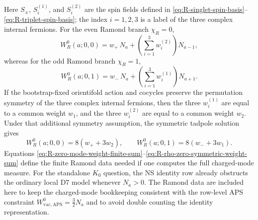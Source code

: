 \documentclass[11pt]{article}
\newcommand{\vac}{\mathrm{vac}}
\begin{document}
Here \(S_\pm\), \(S_i^{(1)}\), and \(S_i^{(2)}\) are the spin fields defined in
\eqref{eq:R-singlet-spin-basis}--\eqref{eq:R-triplet-spin-basis}; the index \(i=1,2,3\) is a
label of the three complex internal fermions. For the even Ramond branch \(\chi_R=0\),
\begin{equation}
  W_R^0(a;0,0)
  =
  w_+\,N_a
  +
  \left(\sum_{i=1}^{3}w_i^{(2)}\right)N_{a-1},
  \label{eq:R-rho-zero-even-weight-sum}
\end{equation}
whereas for the odd Ramond branch \(\chi_R=1\),
\begin{equation}
  W_R^0(a;0,1)
  =
  w_-\,N_a
  +
  \left(\sum_{i=1}^{3}w_i^{(1)}\right)N_{a+1}.
  \label{eq:R-rho-zero-odd-weight-sum}
\end{equation}
If the bootstrap-fixed orientifold action and cocycles preserve the permutation symmetry of the
three complex internal fermions, then the three \(w_i^{(1)}\) are equal to a common weight
\(w_1\), and the three \(w_i^{(2)}\) are equal to a common weight \(w_2\). Under that additional
symmetry assumption, the symmetric tadpole solution gives
\begin{equation}
  W_R^0(a;0,0)=8(w_+ +3w_2),
  \qquad
  W_R^0(a;0,1)=8(w_- +3w_1).
  \label{eq:R-rho-zero-symmetric-weight-sum}
\end{equation}
Equations \eqref{eq:R-zero-mode-weight-finite-sum}--\eqref{eq:R-rho-zero-symmetric-weight-sum}
define the finite Ramond data needed if one computes the full charged-mode measure. For the
standalone \(K_0\) question, the NS identity row already obstructs the ordinary local D7 model
whenever \(N_a>0\). The Ramond data are included here to keep the charged-mode bookkeeping
consistent with the row-level APS constraint
\(W_{\vac,\mathrm{APS}}^0=\frac32N_a\) and to avoid double counting the identity representation.
\end{document}
